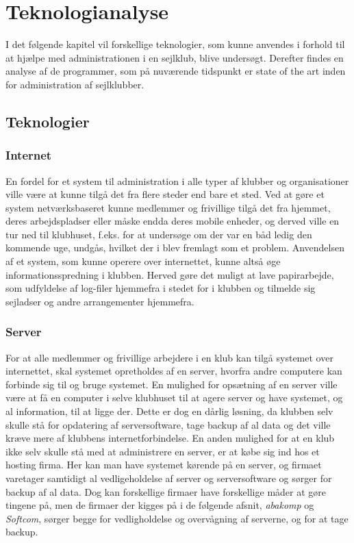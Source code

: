 \chapter{Teknologianalyse}\label{chap:teknologi-analyse}

I det følgende kapitel vil forskellige teknologier, som kunne anvendes i forhold til at hjælpe med
administrationen i en sejlklub, blive undersøgt. Derefter findes en analyse af de programmer, som på nuværende
tidspunkt er state of the art inden for administration af sejlklubber.

\section{Teknologier}

\subsection{Internet}

En fordel for et system til administration i alle typer af klubber og organisationer ville være at kunne tilgå
det fra flere steder end bare et sted. Ved at gøre et system netværksbaseret kunne medlemmer og frivillige
tilgå det fra hjemmet, deres arbejdspladser eller måske endda deres mobile enheder, og derved ville en tur ned
til klubhuset, f.eks. for at undersøge om der var en båd ledig den kommende uge, undgås, hvilket der i
 blev fremlagt som et problem. Anvendelsen af et system, som kunne operere
over internettet, kunne altså øge informationsspredning i klubben. Herved gøre det muligt at lave papirarbejde, som
udfyldelse af log-filer hjemmefra i stedet for i klubben og tilmelde sig sejladser og andre arrangementer
hjemmefra.


\subsection{Server}

For at alle medlemmer og frivillige arbejdere i en klub kan tilgå systemet over internettet, skal systemet
opretholdes af en server, hvorfra andre computere kan forbinde sig til og bruge systemet. En mulighed for
opsætning af en server ville være at få en computer i selve klubhuset til at agere server og have systemet, og
al information, til at ligge der. Dette er dog en dårlig løsning, da klubben selv skulle stå for opdatering af
serversoftware, tage backup af al data og det ville kræve mere af klubbens internetforbindelse. En anden
mulighed for at en klub ikke selv skulle stå med at administrere en server, er at købe sig ind hos et hosting
firma. Her kan man have systemet kørende på en server, og firmaet varetager samtidigt al vedligeholdelse af
server og serversoftware og sørger for backup af al data. Dog kan forskellige firmaer have forskellige måder
at gøre tingene på, men de firmaer der kigges på i de følgende afsnit, \textit{abakomp} og \textit{Softcom}, sørger begge for vedligholdelse og overvågning af serverne, og for at tage backup. 

